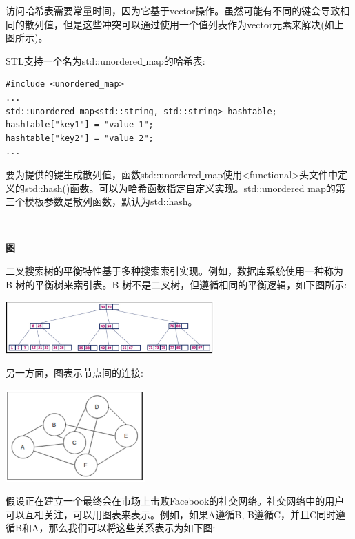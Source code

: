 访问哈希表需要常量时间，因为它基于vector操作。虽然可能有不同的键会导致相同的散列值，但是这些冲突可以通过使用一个值列表作为vector元素来解决(如上图所示)。 \par
STL支持一个名为std::unordered\underline{ }map的哈希表: \par

\begin{lstlisting}[caption={}]
#include <unordered_map>
...
std::unordered_map<std::string, std::string> hashtable;
hashtable["key1"] = "value 1";
hashtable["key2"] = "value 2";
...
\end{lstlisting}

要为提供的键生成散列值，函数std::unordered\underline{ }map使用<functional>头文件中定义的std::hash()函数。可以为哈希函数指定自定义实现。std::unordered\underline{ }map的第三个模板参数是散列函数，默认为std::hash。 \par

\noindent\textbf{}\ \par
\textbf{图} \ \par
二叉搜索树的平衡特性基于多种搜索索引实现。例如，数据库系统使用一种称为B-树的平衡树来索引表。B-树不是二叉树，但遵循相同的平衡逻辑，如下图所示: \par

\begin{center}
	\includegraphics[width=0.6\textwidth]{content/Section-2/Chapter-6/26}
\end{center}

另一方面，图表示节点间的连接: \par

\begin{center}
	\includegraphics[width=0.4\textwidth]{content/Section-2/Chapter-6/27}
\end{center}

假设正在建立一个最终会在市场上击败Facebook的社交网络。社交网络中的用户可以互相关注，可以用图表来表示。例如，如果A遵循B, B遵循C，并且C同时遵循B和A，那么我们可以将这些关系表示为如下图: \par

